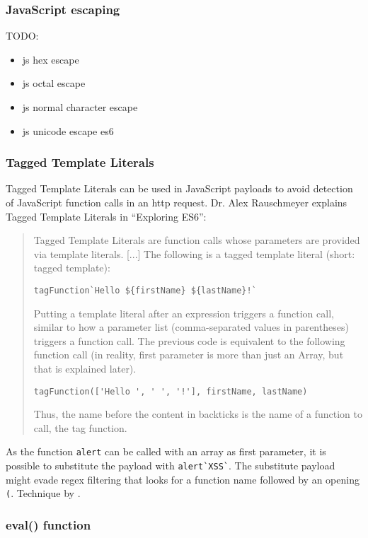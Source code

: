 \subsubsection{JavaScript escaping}
\label{sec:jsescape}
{\color{red} TODO:
	\begin{itemize}
		\item js hex escape
		\item js octal escape
		\item js normal character escape
		\item js unicode escape es6
	\end{itemize}
}

\subsubsection{Tagged Template Literals}
\label{sec:taggedtemplateliterals}
Tagged Template Literals can be used in JavaScript payloads to avoid detection of JavaScript function calls in an http request. Dr. Alex Rauschmeyer explains Tagged Template Literals in ``Exploring ES6'':
\begin{quotation} Tagged Template Literals are function calls whose parameters are provided via template literals. [...]
	The following is a tagged template literal (short: tagged template):
	\begin{lstlisting}
tagFunction`Hello ${firstName} ${lastName}!`
\end{lstlisting}
	Putting a template literal after an expression triggers a function call, similar to how a parameter list (comma-separated values in parentheses) triggers a function call. The previous code is equivalent to the following function call (in reality, first parameter is more than just an Array, but that is explained later).
	\begin{lstlisting}
tagFunction(['Hello ', ' ', '!'], firstName, lastName)
\end{lstlisting}
	Thus, the name before the content in backticks is the name of a function to call, the tag function.
	\cite{exploringes6/templatelit}
\end{quotation}

As the function \verb|alert| can be called with an array as first parameter, it is possible to substitute the payload with \verb|alert`XSS`|. The substitute payload might evade regex filtering that looks for a function name followed by an opening \verb|(|.
Technique by \cite{onecons/wafbypass}.


\subsubsection{eval() function}
\label{sec:eval}

